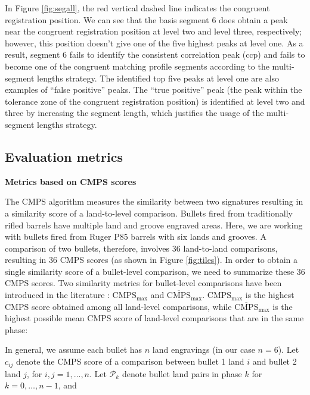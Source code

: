 In Figure \ref{fig:segall}, the red vertical dashed line indicates the
congruent registration position. We can see that the basis segment 6
does obtain a peak near the congruent registration position at level two
and level three, respectively; however, this position doesn't give one
of the five highest peaks at level one. As a result, segment 6 fails to
identify the consistent correlation peak (ccp) and fails to become one
of the congruent matching profile segments according to the
multi-segment lengths strategy. The identified top five peaks at level
one are also examples of ``false positive'' peaks. The ``true positive''
peak (the peak within the tolerance zone of the congruent registration
position) is identified at level two and three by increasing the segment
length, which justifies the usage of the multi-segment lengths strategy.

\hypertarget{evaluation-metrics}{%
\subsection{Evaluation metrics}\label{evaluation-metrics}}

\textbf{Metrics based on CMPS scores}

The CMPS algorithm measures the similarity between two signatures
resulting in a similarity score of a land-to-level comparison. Bullets
fired from traditionally rifled barrels have multiple land and groove
engraved areas. Here, we are working with bullets fired from Ruger P85
barrels with six lands and grooves. A comparison of two bullets,
therefore, involves 36 land-to-land comparisons, resulting in 36 CMPS
scores (as shown in Figure \ref{fig:tiles}). In order to obtain a single
similarity score of a bullet-level comparison, we need to summarize
these 36 CMPS scores. Two similarity metrics for bullet-level
comparisons have been introduced in the literature \citep{cmps}:
\(\mathrm{CMPS_{max}}\) and \(\mathrm{\overline{CMPS}_{max}}\).
\(\mathrm{CMPS_{max}}\) is the highest CMPS score obtained among all
land-level comparisons, while \(\mathrm{\overline{CMPS}_{max}}\) is the
highest possible mean CMPS score of land-level comparisons that are in
the same phase:

In general, we assume each bullet has \(n\) land engravings (in our case
\(n=6\)). Let \(c_{ij}\) denote the CMPS score of a comparison between
bullet 1 land \(i\) and bullet 2 land \(j\), for \(i,j = 1, \dots, n\).
Let \(\mathcal{P}_k\) denote bullet land pairs in phase \(k\) for
\(k = 0, \dots, n-1\), and

